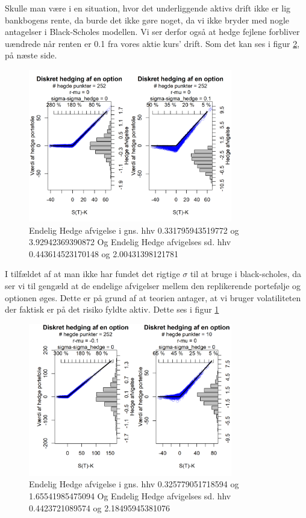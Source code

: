 \documentclass{article}
\theoremstyle{definition}
\theoremstyle{remark}
\begin{document}
Skulle man være i en situation, hvor det underliggende aktivs drift ikke er lig bankbogens rente, da burde det ikke gøre noget, da vi ikke bryder med nogle antagelser i Black-Scholes modellen. Vi ser derfor også at hedge fejlene forbliver uændrede når renten er 0.1 fra vores aktie kurs' drift. Som det kan ses i figur \ref{fig:my_label5}, på næste side.
\begin{figure}
    \centering
    \includegraphics[width=3.5in]{Overleaf/1 opttype_standard_sigma.png}
    \caption{Endelig Hedge afvigelse i gns. hhv 0.331795943519772 og 3.92942369390872 Og Endelig Hedge afvigelses sd. hhv 0.443614523170148 og 2.00431398121781}
    \label{fig:my_label4}
\end{figure}

I tilfældet af at man ikke har fundet det rigtige $\sigma$ til at bruge i black-scholes, da ser vi til gengæld at de endelige afvigelser mellem den replikerende portefølje og optionen øges. Dette er på grund af at teorien antager, at vi bruger volatiliteten der faktisk er på det risiko fyldte aktiv. Dette ses i figur \ref{fig:my_label4}
\begin{figure}
    \centering
    \includegraphics[width=3.5in]{Overleaf/1 opttype_mu_Nhedge.png}
    \caption{Endelig Hedge afvigelse i gns. hhv 0.325779051718594 og 1.65541985475094 Og Endelig Hedge afvigelses sd. hhv 0.4423721089574 og 2.18495945381076}
    \label{fig:my_label5}
\end{figure}
\end{document}
